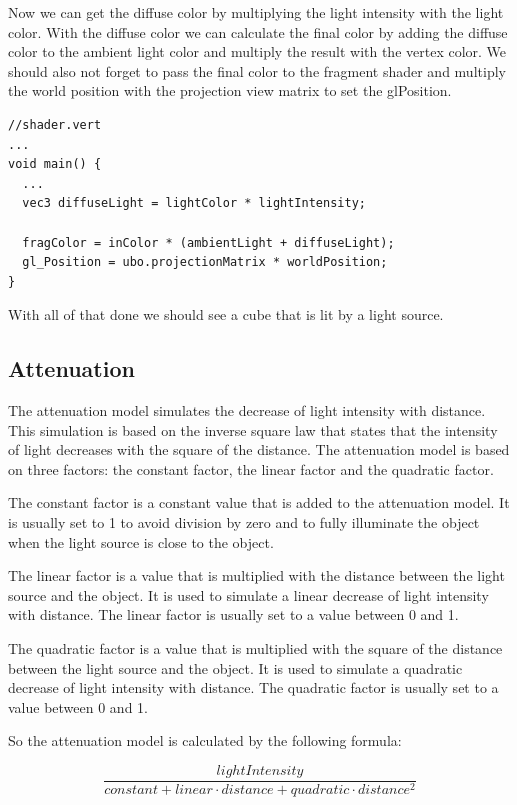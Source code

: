 \documentclass[12pt]{report} \usepackage{preamble}
\begin{document}
Now we can get the diffuse color by multiplying the light intensity with the light color.
With the diffuse color we can calculate the final color by adding the diffuse color to the ambient light color and multiply the result with the vertex color.
We should also not forget to pass the final color to the fragment shader and multiply the world position with the projection view matrix
to set the gl\textunderscore Position.

\begin{lstlisting}[Language=C++]
//shader.vert
...
void main() {
  ...
  vec3 diffuseLight = lightColor * lightIntensity;

  fragColor = inColor * (ambientLight + diffuseLight);
  gl_Position = ubo.projectionMatrix * worldPosition;
}
\end{lstlisting}

With all of that done we should see a cube that is lit by a light source.

\subsection{Attenuation}

The attenuation model simulates the decrease of light intensity with distance.
This simulation is based on the inverse square law that states that the intensity of light decreases with the square of the distance.
The attenuation model is based on three factors: the constant factor, the linear factor and the quadratic factor.

The constant factor is a constant value that is added to the attenuation model.
It is usually set to 1 to avoid division by zero and to fully illuminate the object when the light source is close to the object.

The linear factor is a value that is multiplied with the distance between the light source and the object.
It is used to simulate a linear decrease of light intensity with distance. The linear factor is usually set to a value between 0 and 1.

The quadratic factor is a value that is multiplied with the square of the distance between the light source and the object.
It is used to simulate a quadratic decrease of light intensity with distance. The quadratic factor is usually set to a value between 0 and 1.

So the attenuation model is calculated by the following formula:

\[
	\frac{lightIntensity}{constant + linear \cdot distance + quadratic \cdot distance^2}
\]
\end{document}
